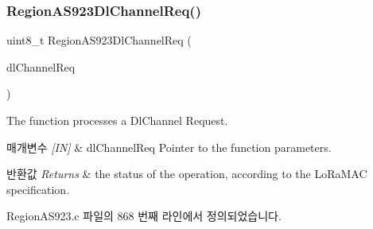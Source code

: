\subsubsection{\texorpdfstring{Region\+A\+S923\+Dl\+Channel\+Req()}{RegionAS923DlChannelReq()}}
{\footnotesize\ttfamily uint8\+\_\+t Region\+A\+S923\+Dl\+Channel\+Req (\begin{DoxyParamCaption}\item[{\mbox{\hyperlink{group___r_e_g_i_o_n_gae0d608ff1f8ea0a430e4f9a4c38ec7f3}{Dl\+Channel\+Req\+Params\+\_\+t}} $\ast$}]{dl\+Channel\+Req }\end{DoxyParamCaption})}



The function processes a Dl\+Channel Request. 


\begin{DoxyParams}{매개변수}
{\em \mbox{[}\+I\+N\mbox{]}} & dl\+Channel\+Req Pointer to the function parameters.\\
\hline
\end{DoxyParams}

\begin{DoxyRetVals}{반환값}
{\em Returns} & the status of the operation, according to the Lo\+Ra\+M\+AC specification. \\
\hline
\end{DoxyRetVals}


Region\+A\+S923.\+c 파일의 868 번째 라인에서 정의되었습니다.



